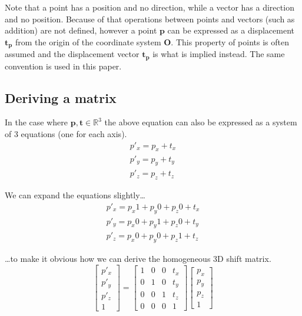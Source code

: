 \documentclass[]{report}   %
\begin{document}
Note that a point has a position and no direction, while a vector has a direction and no position. Because of that operations between points and vectors (such as addition) are not defined, however a point \(\mathbf{p}\) can be expressed as a displacement \(\mathbf{t_p}\) from the origin of the coordinate system \(\mathbf{O}\). This property of points is often assumed and the displacement vector \(\mathbf{t_p}\) is what is implied instead. The same convention is used in this paper.


\subsection{Deriving a matrix}
In the case where \(\mathbf{p}, \mathbf{t} \in \mathbb{R}^3\) the above equation can also be expressed as a system of 3 equations (one for each axis).
\begin{align*}
	p\prime_x = p_x + t_x	\\
	p\prime_y = p_y + t_y	\\
	p\prime_z = p_z + t_z
\end{align*}

We can expand the equations slightly\dots
\begin{align*}
	p\prime_x = p_x 1+p_y 0+p_z 0+t_x	\\
	p\prime_y = p_x 0+p_y 1+p_z 0+t_y	\\
	p\prime_z = p_x 0+p_y 0+p_z 1+t_z
\end{align*}

\dots to make it obvious how we can derive the homogeneous 3D shift matrix.
\[
	\begin{bmatrix}
	p\prime_x \\
	p\prime_y \\
	p\prime_z \\
	1
	\end{bmatrix}
	=	
	\begin{bmatrix}
	1 & 0 & 0 & t_x \\
	0 &	1 & 0 & t_y \\
	0 & 0 & 1 &	t_z \\
	0 & 0 & 0 &	1
	\end{bmatrix}
	\begin{bmatrix}
		p_x \\
		p_y \\
		p_z \\
		1
	\end{bmatrix}
\]



\end{document}
